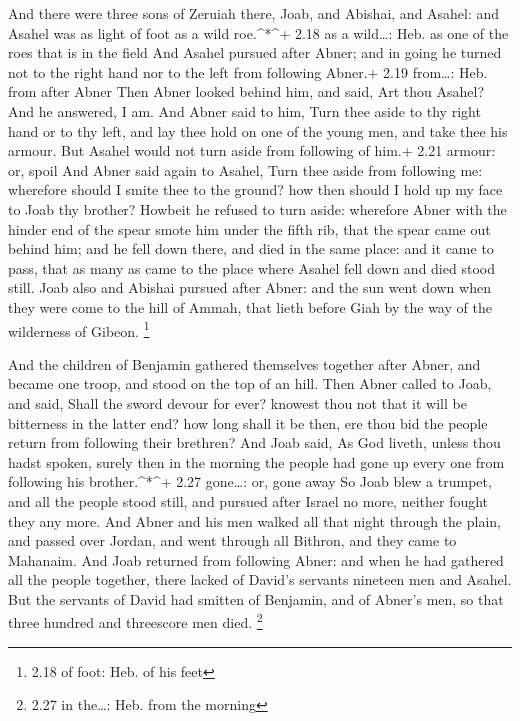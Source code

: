  And there were three sons of Zeruiah there, Joab, and
Abishai, and Asahel: and Asahel was as light of foot as a wild
roe.\^{}*\^{}+ 2.18 as a wild\ldots: Heb. as one of the roes that is in
the field  And Asahel pursued after Abner; and in going he
turned not to the right hand nor to the left from following Abner.+ 2.19
from\ldots: Heb. from after Abner  Then Abner looked behind
him, and said, Art thou Asahel? And he answered, I am.  And
Abner said to him, Turn thee aside to thy right hand or to thy left, and
lay thee hold on one of the young men, and take thee his armour. But
Asahel would not turn aside from following of him.+ 2.21 armour: or,
spoil  And Abner said again to Asahel, Turn thee aside from
following me: wherefore should I smite thee to the ground? how then
should I hold up my face to Joab thy brother?  Howbeit he
refused to turn aside: wherefore Abner with the hinder end of the spear
smote him under the fifth rib, that the spear came out behind him; and
he fell down there, and died in the same place: and it came to pass,
that as many as came to the place where Asahel fell down and died stood
still.  Joab also and Abishai pursued after Abner: and the
sun went down when they were come to the hill of Ammah, that lieth
before Giah by the way of the wilderness of Gibeon. \footnote{2.18 of
  foot: Heb. of his feet}

 And the children of Benjamin gathered themselves together
after Abner, and became one troop, and stood on the top of an hill.
 Then Abner called to Joab, and said, Shall the sword
devour for ever? knowest thou not that it will be bitterness in the
latter end? how long shall it be then, ere thou bid the people return
from following their brethren?  And Joab said, As God
liveth, unless thou hadst spoken, surely then in the morning the people
had gone up every one from following his brother.\^{}*\^{}+ 2.27
gone\ldots: or, gone away  So Joab blew a trumpet, and all
the people stood still, and pursued after Israel no more, neither fought
they any more.  And Abner and his men walked all that night
through the plain, and passed over Jordan, and went through all Bithron,
and they came to Mahanaim.  And Joab returned from
following Abner: and when he had gathered all the people together, there
lacked of David's servants nineteen men and Asahel.  But
the servants of David had smitten of Benjamin, and of Abner's men, so
that three hundred and threescore men died. \footnote{2.27 in the\ldots:
  Heb. from the morning}

